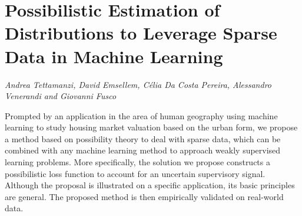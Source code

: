 \documentclass[../booklet.tex]{subfiles}
\begin{document}
\section[Possibilistic Estimation of Distributions to Leverage Sparse Data in Machine Learning. {\it Andrea Tettamanzi, David Emsellem, Célia Da Costa Pereira, Alessandro Venerandi and Giovanni Fusco}]{Possibilistic Estimation of Distributions to Leverage Sparse Data in Machine Learning}
    

\begin{center}
  {\it Andrea Tettamanzi, David Emsellem, Célia Da Costa Pereira, Alessandro Venerandi and Giovanni Fusco}
\end{center}

\vskip 0.8cm


Prompted by an application in the area of human geography using machine learning to
study housing market valuation based on the urban form, we propose a method based on
possibility theory to deal with sparse data, which can be combined with any machine learning
method to approach weakly supervised learning problems.
More specifically, the solution we propose constructs a possibilistic
loss function to account for an uncertain supervisory signal.
Although the proposal is illustrated on a specific application, its basic principles
are general. The proposed method is then empirically validated on real-world data.
\end{document}
